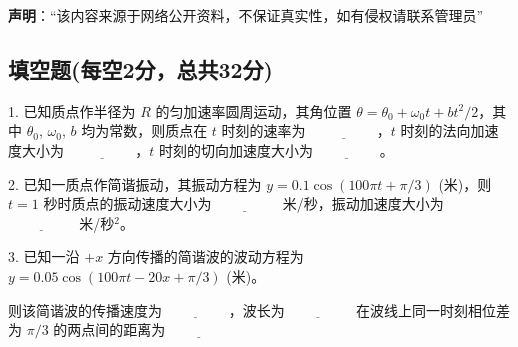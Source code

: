 
\textbf{声明}：“该内容来源于网络公开资料，不保证真实性，如有侵权请联系管理员”

\subsection{填空题(每空2分，总共32分)}

1. 已知质点作半径为 \( R \) 的匀加速率圆周运动，其角位置 \( \theta = \theta_0 + \omega_0 t + bt^2/2 \)，其中 \( \theta_0 \), \( \omega_0 \), \( b \) 均为常数，则质点在 \( t \) 时刻的速率为 $\underline{\hspace{2cm}}$，\( t \) 时刻的法向加速度大小为 $\underline{\hspace{2cm}}$，\( t \) 时刻的切向加速度大小为$\underline{\hspace{2cm}}$。

2. 已知一质点作简谐振动，其振动方程为 \( y = 0.1 \cos (100\pi t + \pi/3) \) (米)，则 \( t = 1 \) 秒时质点的振动速度大小为$\underline{\hspace{2cm}}$ 米/秒，振动加速度大小为 $\underline{\hspace{2cm}}$ 米/秒\(^2\)。

3. 已知一沿 $ +x $ 方向传播的简谐波的波动方程为$y = 0.05 \cos (100\pi t - 20x + \pi/3)$ (米)。

则该简谐波的传播速度为$\underline{\hspace{2cm}}$，波长为$\underline{\hspace{2cm}}$ 在波线上同一时刻相位差为 $\pi/3$ 的两点间的距离为$\underline{\hspace{2cm}}$
